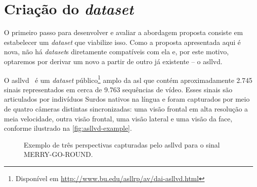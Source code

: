 \section{Criação do \textit{dataset}}
\label{sec:metodologia-datasets}

O primeiro passo para desenvolver e avaliar a abordagem proposta consiste em estabelecer um \textit{dataset} que viabilize isso. Como a proposta apresentada aqui é nova, não há \textit{dataset}s diretamente compatíveis com ela e, por este motivo, optaremos por derivar um novo a partir de outro já existente -- o \acrfull{asllvd}.

O \acrshort{asllvd}~\cite{athitsos-2008-asllvd,neidle-2012-asllvd} é um \textit{dataset} público\footnote{Disponível em \url{http://www.bu.edu/asllrp/av/dai-asllvd.html}} amplo da \acrshort{asl} que contém aproximadamente 2.745 sinais representados em cerca de 9.763 sequências de vídeo. Esses sinais são articulados por indivíduos Surdos nativos na língua e foram capturados por meio de quatro câmeras distintas sincronizadas: uma visão frontal em alta resolução a meia velocidade, outra visão frontal, uma visão lateral e uma visão da face, conforme ilustrado na \autoref{fig:asllvd-example}.

\begin{figure}[ht!]
    \centering
    \caption{\textmd{Exemplo de três perspectivas capturadas pelo \acrshort{asllvd} para o sinal MERRY-GO-ROUND.}}
    \label{fig:asllvd-example}
\end{figure}


